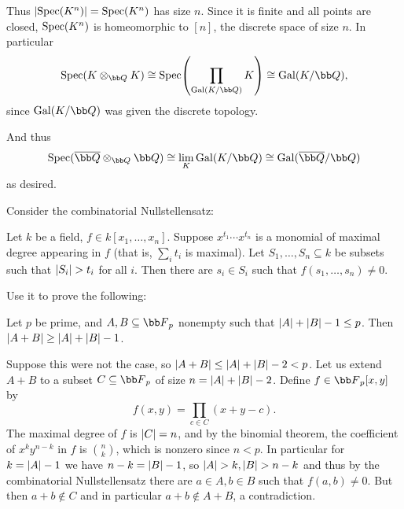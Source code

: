     Thus $\mathopen{}\mathclose{\left|{\rm Spec}(K^n)\right|}={\rm Spec}(K^n)$ has size $n$.
    Since it is finite and all points are closed, ${\rm Spec}(K^n)$ is homeomorphic to $[n]$, the discrete space of size $n$.
    In particular
    $$ \spec(K\otimes_\bQ K) \cong \spec\parens{\prod_{\Gal(K/\bQ)}K} \cong \Gal(K/\bQ) , $$
    since $\Gal(K/\bQ)$ was given the discrete topology.

    And thus
    $$ \spec(\bar\bQ\otimes_\bQ\bQ) \cong \lim_K \Gal(K/\bQ) \cong \Gal(\bar\bQ/\bQ) $$
    as desired.
\eenum

\bprob

    Consider the {\emphcolor combinatorial Nullstellensatz}:

    \domcountfalse
    \bthrm[title=Combinatorial Nullstellensatz]

        Let $k$ be a field, $f\in k[x_1,\dots,x_n]$.
        Suppose $x^{t_1}\cdots x^{t_n}$ is a monomial of maximal degree appearing in $f$ (that is, $\sum_it_i$ is maximal).
        Let $S_1,\dots,S_n\subseteq k$ be subsets such that $\mathopen{}\mathclose{\left|S_i\right|}>t_i$ for all $i$.
        Then there are $s_i\in S_i$ such that $f(s_1,\dots,s_n)\neq0$.

    \ethrm

    \noindent Use it to prove the following:

    \bthrm[title=Cauchy-Davenport]

        Let $p$ be prime, and $A,B\subseteq\bF_p$ nonempty such that $\mathopen{}\mathclose{\left|A\right|}+\mathopen{}\mathclose{\left|B\right|}-1\leq p$.
        Then $\mathopen{}\mathclose{\left|A+B\right|}\geq\mathopen{}\mathclose{\left|A\right|}+\mathopen{}\mathclose{\left|B\right|}-1$.

    \ethrm

\eprob

Suppose this were not the case, so $\mathopen{}\mathclose{\left|A+B\right|}\leq\mathopen{}\mathclose{\left|A\right|}+\mathopen{}\mathclose{\left|B\right|}-2<p$.
Let us extend $A+B$ to a subset $C\subseteq\bF_p$ of size $n=\mathopen{}\mathclose{\left|A\right|}+\mathopen{}\mathclose{\left|B\right|}-2$.
Define $f\in\bF_p[x,y]$ by
$$ f(x,y) = \prod_{c\in C}(x+y-c) . $$
The maximal degree of $f$ is $\mathopen{}\mathclose{\left|C\right|}=n$, and by the binomial theorem, the coefficient of $x^ky^{n-k}$ in $f$ is $\binom nk$, which is nonzero since $n<p$.
In particular for $k=\mathopen{}\mathclose{\left|A\right|}-1$ we have $n-k=\mathopen{}\mathclose{\left|B\right|}-1$, so $\mathopen{}\mathclose{\left|A\right|}>k,\mathopen{}\mathclose{\left|B\right|}>n-k$ and thus by the combinatorial Nullstellensatz there are $a\in A,b\in B$ such that $f(a,b)\neq0$.
But then $a+b\notin C$ and in particular $a+b\notin A+B$, a contradiction.

\bye


